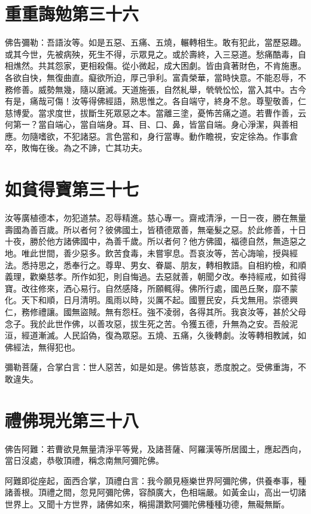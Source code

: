 \documentclass{zhvt-classic}
\begin{document}
\chapter*{重重誨勉第三十六}

佛告彌勒：吾語汝等。如是五惡、五痛、五燒，輾轉相生。敢有犯此，當歷惡趣。或其今世，先被病殃，死生不得，示眾見之。或於壽終，入三惡道。愁痛酷毒，自相燋然。共其怨家，更相殺傷。從小微起，成大困劇。皆由貪著財色，不肯施惠。各欲自快，無復曲直。癡欲所迫，厚己爭利。富貴榮華，當時快意。不能忍辱，不務修善。威勢無幾，隨以磨滅。天道施張，自然糺舉，煢煢忪忪，當入其中。古今有是，痛哉可傷！汝等得佛經語，熟思惟之。各自端守，終身不怠。尊聖敬善，仁慈博愛。當求度世，拔斷生死眾惡之本。當離三塗，憂怖苦痛之道。若曹作善，云何第一？當自端心，當自端身。耳、目、口、鼻，皆當自端。身心淨潔，與善相應。勿隨嗜欲，不犯諸惡。言色當和，身行當專。動作瞻視，安定徐為。作事倉卒，敗悔在後。為之不諦，亡其功夫。

\chapter*{如貧得寶第三十七}

汝等廣植德本，勿犯道禁。忍辱精進。慈心專一。齋戒清淨，一日一夜，勝在無量壽國為善百歲。所以者何？彼佛國土，皆積德眾善，無毫髮之惡。於此修善，十日十夜，勝於他方諸佛國中，為善千歲。所以者何？他方佛國，福德自然，無造惡之地。唯此世間，善少惡多。飲苦食毒，未嘗寧息。吾哀汝等，苦心誨喻，授與經法。悉持思之，悉奉行之。尊卑、男女、眷屬、朋友，轉相教語。自相約檢，和順義理，歡樂慈孝。所作如犯，則自悔過。去惡就善，朝聞夕改。奉持經戒，如貧得寶。改往修來，洒心易行。自然感降，所願輒得。佛所行處，國邑丘聚，靡不蒙化。天下和順，日月清明。風雨以時，災厲不起。國豐民安，兵戈無用。崇德興仁，務修禮讓。國無盜賊。無有怨枉。強不凌弱，各得其所。我哀汝等，甚於父母念子。我於此世作佛，以善攻惡，拔生死之苦。令獲五德，升無為之安。吾般泥洹，經道漸滅。人民諂偽，復為眾惡。五燒、五痛，久後轉劇。汝等轉相教誡，如佛經法，無得犯也。

彌勒菩薩，合掌白言：世人惡苦，如是如是。佛皆慈哀，悉度脫之。受佛重誨，不敢違失。

\chapter*{禮佛現光第三十八}

佛告阿難：若曹欲見無量清淨平等覺，及諸菩薩、阿羅漢等所居國土，應起西向，當日沒處，恭敬頂禮，稱念南無阿彌陀佛。

阿難即從座起，面西合掌，頂禮白言：我今願見極樂世界阿彌陀佛，供養奉事，種諸善根。頂禮之間，忽見阿彌陀佛，容顏廣大，色相端嚴。如黃金山，高出一切諸世界上。又聞十方世界，諸佛如來，稱揚讚歎阿彌陀佛種種功德，無礙無斷。
\end{document}
